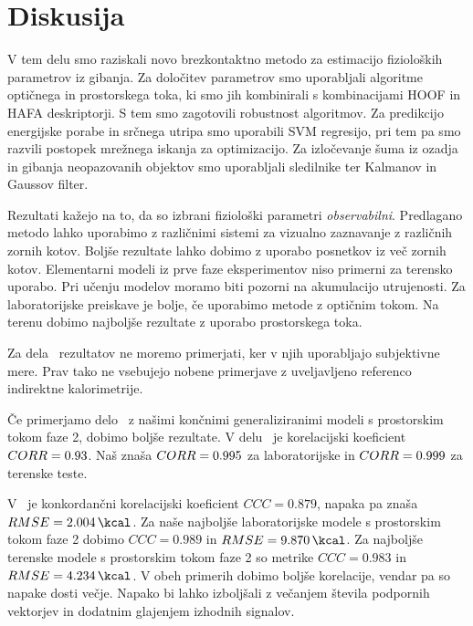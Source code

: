\chapter{Diskusija}\label{sec:diskusija}
V tem delu smo raziskali novo brezkontaktno metodo za estimacijo fizioloških parametrov iz gibanja. Za določitev parametrov smo uporabljali algoritme optičnega in prostorskega toka, ki smo jih kombinirali s kombinacijami HOOF in HAFA deskriptorji. S tem smo zagotovili robustnost algoritmov. Za predikcijo energijske porabe in srčnega utripa smo uporabili SVM regresijo, pri tem pa smo razvili \nurbf postopek mrežnega iskanja za optimizacijo. Za izločevanje šuma iz ozadja in gibanja neopazovanih objektov smo uporabljali sledilnike ter Kalmanov in Gaussov filter.

Rezultati kažejo na to, da so izbrani fiziološki parametri \emph{observabilni}. Predlagano metodo lahko uporabimo z različnimi sistemi za vizualno zaznavanje z različnih zornih kotov. Boljše rezultate lahko dobimo z uporabo posnetkov iz več zornih kotov. Elementarni modeli iz prve faze eksperimentov niso primerni za terensko uporabo. Pri učenju modelov moramo biti pozorni na akumulacijo utrujenosti. Za laboratorijske preiskave je bolje, če uporabimo metode z optičnim tokom. Na terenu dobimo najboljše rezultate z uporabo prostorskega toka.

Za dela~\cite{peker2004framework,silva2015assessing,osgnach2010energy} rezultatov ne moremo primerjati, ker v njih uporabljajo subjektivne mere. Prav tako ne vsebujejo nobene primerjave z uveljavljeno referenco indirektne kalorimetrije.

Če primerjamo delo~\cite{botton2011energy} z našimi končnimi generaliziranimi modeli s prostorskim tokom faze 2, dobimo boljše rezultate. V delu~\cite{botton2011energy} je korelacijski koeficient ${CORR}=\num{0.93}$. Naš znaša ${CORR}=\num{0.995}$ za laboratorijske in ${CORR}=\num{0.999}$ za terenske teste. 

V~\cite{nathan2015estimating} je konkordančni korelacijski koeficient $CCC=\num{0.879}$, napaka pa znaša $\rmse=\SI{2.004}{\kcal}$. Za naše najboljše laboratorijske modele s prostorskim tokom faze 2 dobimo $CCC=\num{0.989}$ in $\rmse=\SI{9.870}{\kcal}$. Za najboljše terenske modele s prostorskim tokom faze 2 so metrike  $CCC=\num{0.983}$ in $\rmse=\SI{4.234}{\kcal}$. V obeh primerih dobimo boljše korelacije, vendar pa so napake dosti večje. Napako bi lahko izboljšali z večanjem števila podpornih vektorjev in dodatnim glajenjem izhodnih signalov.

